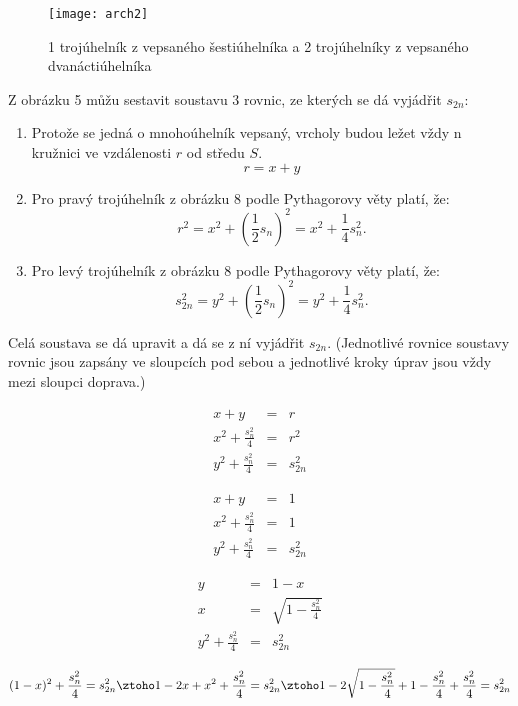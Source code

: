 \documentclass[rocnikovka]{gzwroc} %
\begin{document}
\begin{figure}[!ht]
\texttt{[image: arch2]}
\caption{1 trojúhelník z vepsaného šestiúhelníka a 2 trojúhelníky z vepsaného dvanáctiúhelníka}
\label{fig:kruh}
\end{figure}
Z obrázku 5 můžu sestavit soustavu 3 rovnic, ze kterých se dá vyjádřit $s_{2n}$:
\begin{enumerate}
\item Protože se jedná o mnohoúhelník vepsaný, vrcholy budou ležet vždy n kružnici ve vzdálenosti $r$ od středu $S$.
$$
r = x+y
$$
\item Pro pravý trojúhelník z obrázku 8 podle Pythagorovy věty platí, že:
$$
r^2=x^2+\left(\frac{1}{2}s_n\right)^2=x^2+\frac{1}{4}s_n^2.
$$
\item Pro levý trojúhelník z obrázku 8 podle Pythagorovy věty platí, že:
$$
s_{2n}^2=y^2+\left(\frac{1}{2}s_n\right)^2=y^2+\frac{1}{4}s_n^2.
$$
\end{enumerate}
Celá soustava se dá upravit a dá se z ní vyjádřit $s_{2n}$. (Jednotlivé rovnice soustavy rovnic jsou zapsány ve sloupcích pod sebou a jednotlivé kroky úprav jsou vždy mezi sloupci doprava.)
\begin{minipage}[t]{0.3\textwidth}
\begin{eqnarray}
x+y &=& r \nonumber \\
x^2+\frac{s_n^2}{4}&=&r^2\nonumber\\
y^2+\frac{s_n^2}{4}&=&s_{2n}^2\nonumber
\end{eqnarray}
\end{minipage}\hfill
\begin{minipage}[t]{0.3\textwidth}
\begin{eqnarray}
x+y &=& 1 \nonumber \\
x^2+\frac{s_n^2}{4}&=&1\nonumber\\
y^2+\frac{s_n^2}{4}&=&s_{2n}^2\nonumber
\end{eqnarray}
\end{minipage}\hfill
\begin{minipage}[t]{0.3\textwidth}
\begin{eqnarray}
y &=& 1-x \nonumber \\
x&=&\sqrt{1-\frac{s_n^2}{4}}\nonumber\\
y^2+\frac{s_n^2}{4}&=&s_{2n}^2\nonumber
\end{eqnarray}
\end{minipage}\hfill
$$
(1-x)^2+\frac{s_n^2}{4}=s_{2n}^2 \ztoho 1-2x+x^2+\frac{s_n^2}{4}=s_{2n}^2 \ztoho 1-2\sqrt{1-\frac{s_n^2}{4}}+1-\frac{s_n^2}{4}+\frac{s_n^2}{4}=s_{2n}^2
$$
\end{document}
